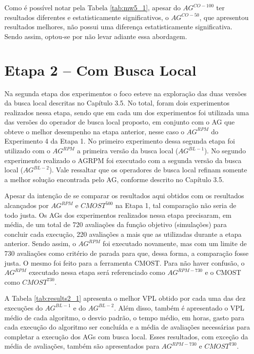 Como é possível notar pela Tabela \ref{tab:mw5_1}, apesar do $AG^{CO-{100}}$ ter resultados diferentes e estatisticamente significativos, o $AG^{CO-{50}}$, que apresentou resultados melhores, não possui uma diferença estatisticamente significativa. Sendo assim, optou-se por não levar adiante essa abordagem.

\section{Etapa 2 – Com Busca Local}

Na segunda etapa dos experimentos o foco esteve na exploração das duas versões da busca local descritas no Capítulo 3.5. No total, foram dois experimentos realizados nessa etapa, sendo que em cada um dos experimentos foi utilizada uma das versões do operador de busca local proposto, em conjunto com o AG que obteve o melhor desempenho na etapa anterior, nesse caso o $AG^{RPM}$ do Experimento 4 da Etapa 1. No primeiro experimento dessa segunda etapa foi utilizado com o $AG^{RPM}$ a primeira versão da busca local ($AG^{BL-1}$). No segundo experimento realizado o AGRPM foi executado com a segunda versão da busca local ($AG^{BL-2}$). Vale ressaltar que os operadores de busca local refinam somente a melhor solução encontrada pelo AG, conforme descrito no Capítulo 3.5.

Apesar da intenção de se comparar os resultados aqui obtidos com os resultados alcançados por $AG^{RPM}$ e  $CMOST^{500}$ na Etapa 1, tal comparação não seria de todo justa. Os AGs dos experimentos realizados nessa etapa precisaram, em média, de um total de 720 avaliações da função objetivo (simulações) para concluir cada execução, 220 avaliações a mais que as utilizadas durante a etapa anterior. Sendo assim, o $AG^{RPM}$ foi executado novamente, mas com um limite de 730 avaliações como critério de parada para que, dessa forma, a comparação fosse justa. O mesmo foi feito para a ferramenta CMOST. Para não haver confusão, o $AG^{RPM}$ executado nessa etapa será referenciado como $AG^{RPM-730}$ e o CMOST como $CMOST^{730}$. 

A Tabela \ref{tab:results2_1} apresenta o melhor VPL obtido por cada uma das dez execuções do $AG^{BL-1}$ e do $AG^{BL-2}$. Além disso, também é apresentado o VPL médio de cada algoritmo, o desvio padrão, o tempo médio, em horas, gasto para cada execução do algoritmo ser concluída e a média de avaliações necessárias para completar a execução dos AGs com busca local. Esses resultados, com exceção da média de avaliações, também são apresentados para $AG^{RPM-730}$ e $CMOST^{730}$.

